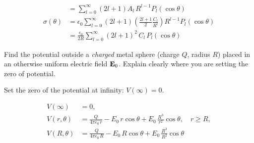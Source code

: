 \begin{hwkProblem}{3.20}{}
\begin{align*}
		&=\sum_{l=0}^{\infty} (2l+1) A_{l}\, R^{l-1} P_{l}(\cos\theta) \\
		\sigma(\theta) &= \epsilon_{0} \sum_{l=0}^{\infty} (2l+1) \left(\frac{2l+1}{2}\frac{C_{l}}{R^{l}}\right) R^{l-1} P_{l}(\cos\theta) \\
		&=\frac{\epsilon_{0}}{2R}\sum_{l=0}^{\infty} (2l+1)^2\, C_{l}\, P_{l}(\cos\theta)
	\end{align*}
\end{hwkProblem}
\begin{hwkProblem}{3.21}{}

	Find the potential outside a \textit{charged} metal sphere (charge \( Q \), radius \( R \)) placed in an otherwise uniform electric field \( \mathbf{E}_{0} \). Explain clearly where you are setting the zero of potential.

	\hwkSol{}

	Set the zero of the potential at infinity: \(V(\infty)=0\).

	\begin{align*}
		V(\infty) &= 0, \\
		V(r,\theta) &= \frac{Q}{4\pi\epsilon_0\,r} - E_0\,r\cos\theta + E_0\,\frac{R^3}{r^2}\cos\theta,\quad r\geq R, \\
		V(R,\theta) &= \frac{Q}{4\pi\epsilon_0\,R} - E_0\,R\cos\theta + E_0\,\frac{R^3}{R^2}\cos\theta
	\end{align*}

\end{hwkProblem}
